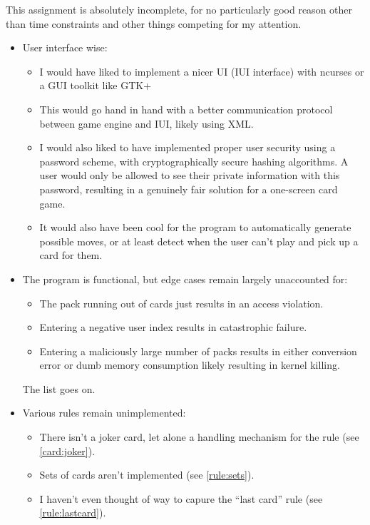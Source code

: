 \documentclass{article}
\begin{document}
    This assignment is absolutely incomplete, for no particularly good reason
    other than time constraints and other things competing for my attention.

    \begin{itemize}
    \item User interface wise:
        \begin{itemize}
        \item I would have liked to implement a nicer UI (IUI interface) with
        ncurses or a GUI toolkit like GTK+
        \item This would go hand in hand with a better communication protocol
        between game engine and IUI, likely using XML.
        \item I would also liked to have implemented proper user security using
        a password scheme, with cryptographically secure hashing algorithms. A
        user would only be allowed to see their private information with this
        password, resulting in a genuinely fair solution for a one-screen card
        game.
        \item It would also have been cool for the program to automatically
        generate possible moves, or at least detect when the user can't play and
        pick up a card for them.
        \end{itemize}
    \item The program is functional, but edge cases remain largely unaccounted
    for:
        \begin{itemize}
        \item The pack running out of cards just results in an access violation.
        \item Entering a negative user index results in catastrophic failure.
        \item Entering a maliciously large number of packs results in either
        conversion error or dumb memory consumption likely resulting in kernel
        killing.
        \end{itemize}
    The list goes on.
    \item Various rules remain unimplemented:
        \begin{itemize}
        \item There isn't a joker card, let alone a handling mechanism for the
        rule (see \ref{card:joker}).
        \item Sets of cards aren't implemented (see \ref{rule:sets}).
        \item I haven't even thought of way to capure the ``last card'' rule
        (see \ref{rule:lastcard}).
        \end{itemize}
    \end{itemize}
\end{document}

